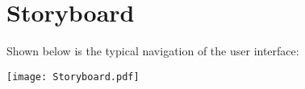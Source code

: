 \let\textcircled=\pgftextcircled
\chapter{Storyboard}
\break
Shown below is the typical navigation of the user interface:
\begin{center}
\texttt{[image: Storyboard.pdf]}
\end{center}
